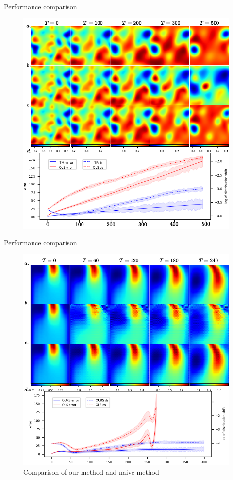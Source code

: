 \documentclass[paper slide]{beamer}
\begin{document}
\begin{frame}{Performance comparison}
	\begin{figure}[H]
          \centering
          \centerline{\includegraphics[width=.75\linewidth]{fig/RD-TR.pdf}}
\end{figure}
\end{frame}

\begin{frame}{Performance comparison}
	\begin{figure}[H]
          \centering
          \centerline{\includegraphics[width=.75\linewidth]{fig/NS-TR.pdf}}
          \caption{Comparison of our method and naive method}
\end{figure}
\end{frame}
\end{document}
